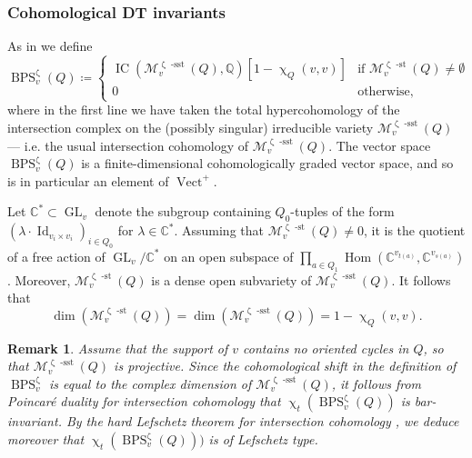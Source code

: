 \documentclass{amsart}
\DeclareMathOperator{\Vect}{Vect}
\DeclareMathOperator{\sst}{-sst}
\DeclareMathOperator{\IC}{IC}
\newcommand{\Msp}{\mathcal{M}}
\DeclareMathOperator{\Hom}{Hom}
\DeclareMathOperator{\Id}{Id}
\DeclareMathOperator{\BPS}{BPS}
\DeclareMathOperator{\stable}{-st}
\DeclareMathOperator{\GL}{GL}
\renewcommand{\zeta}{\upzeta}
\renewcommand{\chi}{\upchi}
\theoremstyle{plain}%
\newtheorem{rem}[thm]{Remark}
\theoremstyle{definition}
\theoremstyle{remark}
\begin{document}
\subsubsection{Cohomological DT invariants}
As in \cite{MeiRei} we define 
\begin{equation}
    \label{BPS_def}
\BPS^{\zeta}_v(Q)\coloneqq \begin{cases} \IC\left(\Msp_v^{\zeta\sst}(Q),\mathbb{Q}\right)[1-\chi_Q(v,v)] &\textrm{if }\Msp^{\zeta\stable}_v(Q)\neq \emptyset\\
0& \textrm{otherwise},\end{cases}
\end{equation}
where in the first line we have taken the total hypercohomology of the intersection complex on the (possibly singular) irreducible variety $\Msp^{\zeta\sst}_v(Q)$ --- i.e. the usual intersection cohomology of $\Msp^{\zeta\sst}_v(Q)$.  
The vector space $\BPS_v^{\zeta}(Q)$ is a finite-dimensional cohomologically graded vector space, and so is in particular an element of $\Vect^+$.  

Let $\mathbb{C}^*\subset \GL_v$ denote the subgroup containing $Q_0$-tuples of the form $(\lambda\cdot \Id_{v_{i}\times v_i})_{i\in Q_0}$ for $\lambda\in\mathbb{C}^*$.  Assuming that $\Msp^{\zeta\stable}_v(Q)\neq 0$, it is the quotient of a free action of $\GL_{v}/\mathbb{C}^*$ on an open subspace of $\prod_{a\in Q_1}\Hom(\mathbb{C}^{v_{t(a)}},\mathbb{C}^{v_{s(a)}})$.  Moreover, $\Msp_v^{\zeta\stable}(Q)$ is a dense open subvariety of $\Msp_v^{\zeta\sst}(Q)$.  It follows that
\begin{equation}
    \label{dim_count}
\dim(\Msp_v^{\zeta\stable}(Q))=\dim(\Msp_v^{\zeta\sst}(Q))=1-\chi_Q(v,v).
\end{equation}

\begin{rem}
Assume that the support of $v$ contains no oriented cycles in $Q$, so that $\Msp^{\zeta\sst}_v(Q)$ is projective.  Since the cohomological shift in the definition of $\BPS^{\zeta}_v$ is equal to 
the complex dimension of $\Msp^{\zeta\sst}_v(Q)$, it follows from Poincar\'e duality for intersection cohomology that $\chi_t(\BPS^{\zeta}_v(Q))$ is bar-invariant.  By the hard Lefschetz theorem for intersection cohomology \cite[Chap. 6]{BBD}, we deduce moreover that $\chi_t(\BPS^{\zeta}_v(Q)))$ is of Lefschetz type.
\end{rem}
\end{document}

